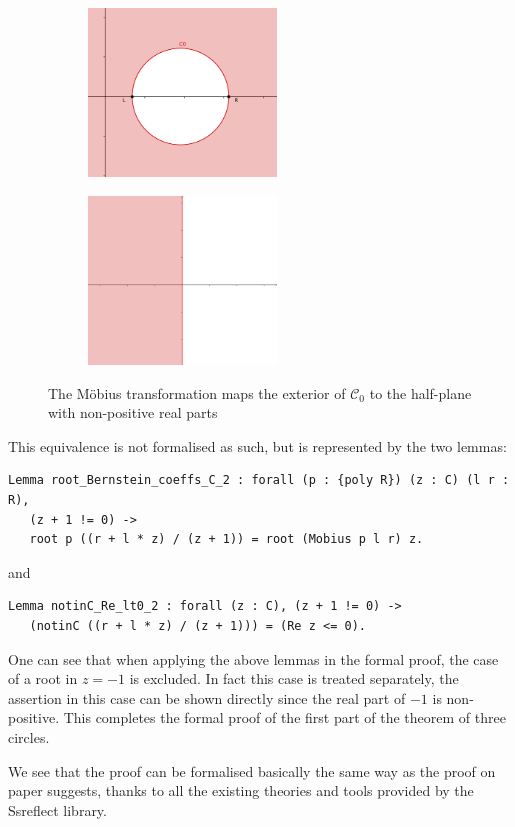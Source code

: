 \documentclass[11pt, a4paper]{article}
\newcommand{\ssc}{{\mathcal C}}
\begin{document}
\begin{figure}[htb!]
 \centering
  \begin{subfigure}
    \centering
    \includegraphics[width=5cm]{3circles_extC01.png}
  \end{subfigure}
  \qquad
  \begin{subfigure}
    \centering
    \includegraphics[width=5cm]{3circles_nonneg1.png}
  \end{subfigure}
  \caption{The M\"obius transformation maps the exterior of $\ssc_0$ to the half-plane with non-positive real parts}
  \label{fig_C0}
\end{figure}


This equivalence is not formalised as such, but is represented by the two lemmas:
\begin{lstlisting}
Lemma root_Bernstein_coeffs_C_2 : forall (p : {poly R}) (z : C) (l r : R),
   (z + 1 != 0) ->
   root p ((r + l * z) / (z + 1)) = root (Mobius p l r) z.
\end{lstlisting}
and
\begin{lstlisting}
Lemma notinC_Re_lt0_2 : forall (z : C), (z + 1 != 0) ->
   (notinC ((r + l * z) / (z + 1))) = (Re z <= 0).
\end{lstlisting}

One can see that when applying the above lemmas in the formal proof, the case of a root in $z = -1$ is excluded. In fact this case is treated separately, the assertion in this case can be shown directly since the real part of $-1$ is non-positive. This completes the formal proof of the first part of the theorem of three circles.

We see that the proof can be formalised basically the same way as the proof on paper suggests, thanks to all the existing theories and tools provided by the Ssreflect library.
\end{document}
